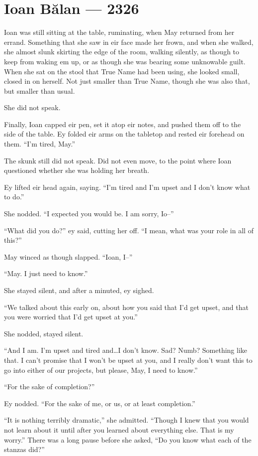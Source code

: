\hypertarget{ioan-bux103lan-2326}{%
\chapter{Ioan Bălan — 2326}\label{ioan-bux103lan-2326}}

Ioan was still sitting at the table, ruminating, when May returned from her errand. Something that she saw in eir face made her frown, and when she walked, she almost slunk skirting the edge of the room, walking silently, as though to keep from waking em up, or as though she was bearing some unknowable guilt. When she sat on the stool that True Name had been using, she looked small, closed in on herself. Not just smaller than True Name, though she was also that, but smaller than usual.

She did not speak.

Finally, Ioan capped eir pen, set it atop eir notes, and pushed them off to the side of the table. Ey folded eir arms on the tabletop and rested eir forehead on them. ``I'm tired, May.''

The skunk still did not speak. Did not even move, to the point where Ioan questioned whether she was holding her breath.

Ey lifted eir head again, saying. ``I'm tired and I'm upset and I don't know what to do.''

She nodded. ``I expected you would be. I am sorry, Io--''

``What did you do?'' ey said, cutting her off. ``I mean, what was your role in all of this?''

May winced as though slapped. ``Ioan, I--''

``May. I just need to know.''

She stayed silent, and after a minuted, ey sighed.

``We talked about this early on, about how you said that I'd get upset, and that you were worried that I'd get upset at you.''

She nodded, stayed silent.

``And I am. I'm upset and tired and\ldots I don't know. Sad? Numb? Something like that. I can't promise that I won't be upset at you, and I really don't want this to go into either of our projects, but please, May, I need to know.''

``For the sake of completion?''

Ey nodded. ``For the sake of me, or us, or at least completion.''

``It is nothing terribly dramatic,'' she admitted. ``Though I knew that you would not learn about it until after you learned about everything else. That is my worry.'' There was a long pause before she asked, ``Do you know what each of the stanzas did?''

